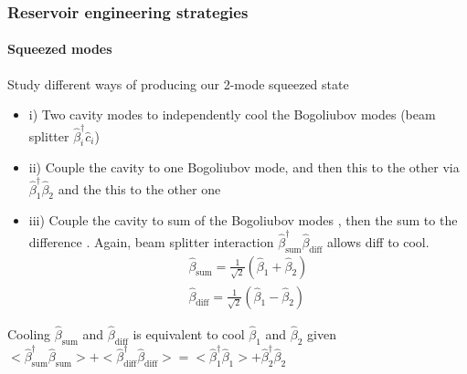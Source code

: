\documentclass[aspectratio=43]{beamer}
\begin{document}
\begin{frame}
	
	\frametitle{Reservoir engineering strategies}
	\framesubtitle{Squeezed modes}
	
	Study different ways of producing our 2-mode squeezed state
	\begin{itemize}
		\item i) Two cavity modes to independently cool the Bogoliubov modes (beam splitter $\hat{\beta}^{\dagger}_{i} \hat{c}_{i}$)
		\item ii) Couple the cavity to one Bogoliubov mode, and then this to the other via $\hat{\beta}^{\dagger}_{1} \hat{\beta}_{2}$ and the this to the other one
		\item iii) Couple the cavity to sum of the Bogoliubov modes , then the sum to the difference . Again, beam splitter interaction $\hat{\beta}^{\dagger}_{\textrm{sum}} \hat{\beta}_{\textrm{diff}}$ allows diff to cool.
		\begin{align}
			\hat{\beta}_{\textrm{sum}} = \frac{1}{\sqrt{2}}(\hat{\beta}_{1} + \hat{\beta}_{2}) \nonumber \\
			\hat{\beta}_{\textrm{diff}} = \frac{1}{\sqrt{2}}(\hat{\beta}_{1} - \hat{\beta}_{2}) \nonumber
		\end{align}
	\end{itemize}

	Cooling $\hat{\beta}_{\textrm{sum}}$ and $\hat{\beta}_{\textrm{diff}}$ is equivalent to cool $\hat{\beta}_{1}$ and $\hat{\beta}_{2}$ given $<\hat{\beta}^{\dagger}_{\textrm{sum}} \hat{\beta}_{\textrm{sum}}> + <\hat{\beta}^{\dagger}_{\textrm{diff}} \hat{\beta}_{\textrm{diff}}> = <\hat{\beta}^{\dagger}_{1} \hat{\beta}_{1}> + \hat{\beta}^{\dagger}_{2} \hat{\beta}_{2}$

\end{frame}
\end{document}
